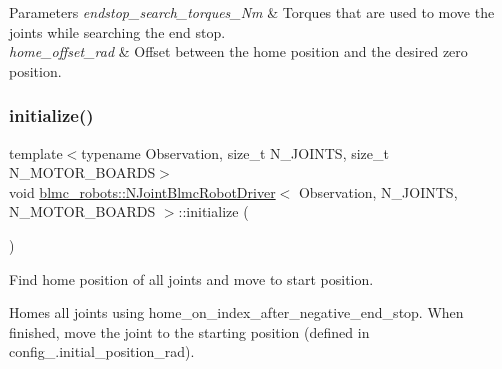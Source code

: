 \begin{DoxyParams}{Parameters}
{\em endstop\+\_\+search\+\_\+torques\+\_\+\+Nm} & Torques that are used to move the joints while searching the end stop. \\
\hline
{\em home\+\_\+offset\+\_\+rad} & Offset between the home position and the desired zero position. \\
\hline
\end{DoxyParams}
\mbox{\label{classblmc__robots_1_1NJointBlmcRobotDriver_a7a1ece2b5d4f0f607a4d0516543b0d48}} 
\subsubsection{\texorpdfstring{initialize()}{initialize()}}
{\footnotesize\ttfamily template$<$typename Observation, size\+\_\+t N\+\_\+\+J\+O\+I\+N\+TS, size\+\_\+t N\+\_\+\+M\+O\+T\+O\+R\+\_\+\+B\+O\+A\+R\+DS$>$ \\
void \hyperlink{classblmc__robots_1_1NJointBlmcRobotDriver}{blmc\+\_\+robots\+::\+N\+Joint\+Blmc\+Robot\+Driver}$<$ Observation, N\+\_\+\+J\+O\+I\+N\+TS, N\+\_\+\+M\+O\+T\+O\+R\+\_\+\+B\+O\+A\+R\+DS $>$\+::initialize (\begin{DoxyParamCaption}{ }\end{DoxyParamCaption})\hspace{0.3cm}{\ttfamily [override]}}



Find home position of all joints and move to start position. 

Homes all joints using home\+\_\+on\+\_\+index\+\_\+after\+\_\+negative\+\_\+end\+\_\+stop. When finished, move the joint to the starting position (defined in {\ttfamily config\+\_\+.\+initial\+\_\+position\+\_\+rad}). \mbox{\label{classblmc__robots_1_1NJointBlmcRobotDriver_a1d9aedee4887a6f34c07481c4520cb5a}} 
